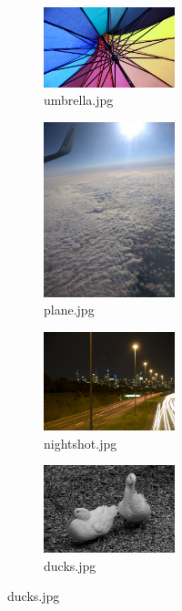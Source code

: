 \documentclass[12pt]{article}
\begin{document}
\begin{figure}[H]
	\begin{subfigure}[b]{0.26\textwidth}
		\includegraphics[width = 1.5in]{umbrella.jpg}
		\caption{umbrella.jpg}
	\end{subfigure}%
	\begin{subfigure}[b]{0.26\textwidth}
		\includegraphics[width = 1.5in]{plane.jpg}
		\caption{plane.jpg}
	\end{subfigure}%
	\begin{subfigure}[b]{0.26\textwidth}
		\includegraphics[width = 1.5in]{nightshot.jpg}
		\caption{nightshot.jpg}
	\end{subfigure}%
	\begin{subfigure}[b]{0.26\textwidth}
		\includegraphics[width = 1.5in]{ducks.jpg}
		\caption{ducks.jpg}
	\end{subfigure}
	

\end{figure}
\end{document}

